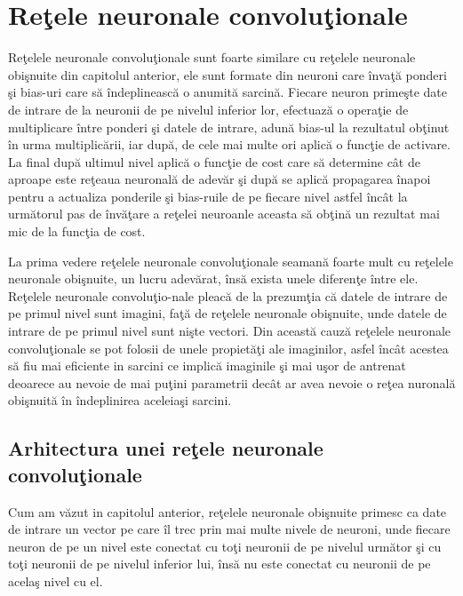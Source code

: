 \chapter{Re\c{t}ele neuronale convolu\c{t}ionale}

Re\c{t}elele neuronale convolu\c{t}ionale  sunt foarte similare cu re\c{t}elele neuronale obi\c{s}nuite din capitolul anterior, ele sunt formate din neuroni care \^{i}nva\c{t}\u{a} ponderi \c{s}i bias-uri care s\u{a} \^{i}ndeplineasc\u{a} o anumit\u{a} sarcin\u{a}. Fiecare neuron prime\c{s}te date de intrare de la neuronii de pe nivelul inferior lor, efectuaz\u{a} o opera\c{t}ie de multiplicare \^{i}ntre ponderi \c{s}i datele de intrare, adun\u{a} bias-ul la rezultatul ob\c{t}inut \^{i}n urma multiplic\u{a}rii, iar dup\u{a}, de cele mai multe ori aplic\u{a} o func\c{t}ie de activare. La final dup\u{a} ultimul nivel aplic\u{a} o func\c{t}ie de cost care s\u{a} determine c\^{a}t de aproape este re\c{t}eaua neuronal\u{a} de adev\u{a}r \c{s}i dup\u{a} se aplic\u{a} propagarea \^{i}napoi pentru a actualiza ponderile \c{s}i bias-ruile de pe fiecare nivel astfel \^{i}nc\^{a}t la urm\u{a}torul pas de \^{i}nv\u{a}\c{t}are a re\c{t}elei neuroanle aceasta s\u{a} ob\c{t}in\u{a} un rezultat mai mic de la func\c{t}ia de cost.

La prima vedere re\c{t}elele neuronale convolu\c{t}ionale seaman\u{a} foarte mult cu re\c{t}elele neuronale obi\c{s}nuite, un lucru adev\u{a}rat, \^{i}ns\u{a} exista unele diferen\c{t}e \^{i}ntre ele. Re\c{t}elele neuronale convolu\c{t}io-nale pleac\u{a} de la prezum\c{t}ia c\u{a} datele de intrare de pe primul nivel sunt imagini, fa\c{t}\u{a} de re\c{t}elele neuronale obi\c{s}nuite, unde datele de intrare de pe primul nivel sunt ni\c{s}te vectori. Din aceast\u{a} cauz\u{a} re\c{t}elele neuronale convolu\c{t}ionale se pot folosii de unele propiet\u{a}\c{t}i ale imaginilor, asfel \^{i}nc\^{a}t acestea s\u{a} fiu mai eficiente in sarcini ce implic\u{a} imaginile \c{s}i mai u\c{s}or de antrenat deoarece au nevoie de mai pu\c{t}ini parametrii dec\^{a}t ar avea nevoie o re\c{t}ea nuronal\u{a} obi\c{s}nuit\u{a} \^{i}n \^{i}ndeplinirea aceleia\c{s}i sarcini.

\section{Arhitectura unei re\c{t}ele neuronale convolu\c{t}ionale}

Cum am v\u{a}zut in capitolul anterior, re\c{t}elele neuronale obi\c{s}nuite primesc ca date de intrare un  vector pe care \^{i}l trec prin mai multe nivele de neuroni, unde fiecare neuron de pe un nivel este conectat cu to\c{t}i neuronii de pe nivelul urm\u{a}tor \c{s}i cu to\c{t}i neuronii de pe nivelul inferior lui, \^{i}ns\u{a} nu este conectat cu neuronii de pe acela\c{s} nivel cu el. 

